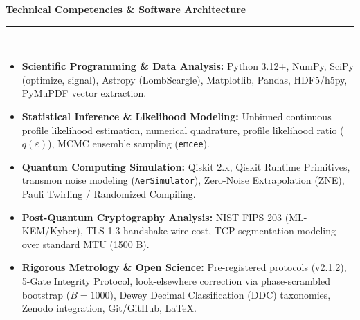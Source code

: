 \documentclass[10pt,a4paper]{article}
\begin{document}
\vspace{0.3cm}
\noindent\textbf{\Large Technical Competencies \& Software Architecture}\\[-0.3cm]
\rule{\textwidth}{0.8pt}\\[0.2cm]
\begin{itemize}
    \setlength{\itemsep}{2pt}
    \item \textbf{Scientific Programming \& Data Analysis:} Python 3.12+, NumPy, SciPy (optimize, signal), Astropy (LombScargle), Matplotlib, Pandas, HDF5/h5py, PyMuPDF vector extraction.
    \item \textbf{Statistical Inference \& Likelihood Modeling:} Unbinned continuous profile likelihood estimation, numerical quadrature, profile likelihood ratio ($q(\varepsilon)$), MCMC ensemble sampling (\texttt{emcee}).
    \item \textbf{Quantum Computing Simulation:} Qiskit 2.x, Qiskit Runtime Primitives, transmon noise modeling (\texttt{AerSimulator}), Zero-Noise Extrapolation (ZNE), Pauli Twirling / Randomized Compiling.
    \item \textbf{Post-Quantum Cryptography Analysis:} NIST FIPS 203 (ML-KEM/Kyber), TLS 1.3 handshake wire cost, TCP segmentation modeling over standard MTU (1500 B).
    \item \textbf{Rigorous Metrology \& Open Science:} Pre-registered protocols (v2.1.2), 5-Gate Integrity Protocol, look-elsewhere correction via phase-scrambled bootstrap ($B=1000$), Dewey Decimal Classification (DDC) taxonomies, Zenodo integration, Git/GitHub, LaTeX.
\end{itemize}
\end{document}
